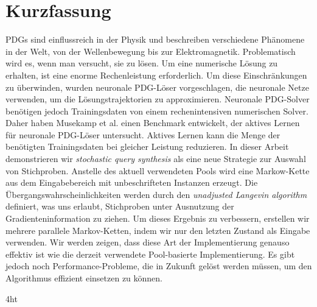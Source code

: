 \documentclass[
  a4paper,  %
  twoside,  %
  bibliography=totoc,
  headsepline,
  cleardoublepage=empty,
  parskip=half,
  draft=false
]{scrbook}
\begin{document}
\cleardoublepage

\section*{Kurzfassung}
PDGs sind einflussreich in der Physik und beschreiben 
verschiedene Phänomene in der Welt, von der Wellenbewegung bis zur Elektromagnetik. Problematisch wird es, wenn man versucht, sie zu lösen. 
Um eine numerische Lösung zu erhalten, 
ist eine enorme Rechenleistung erforderlich. Um diese Einschränkungen zu überwinden, wurden neuronale PDG-Löser vorgeschlagen, die neuronale Netze verwenden, 
um die Lösungstrajektorien zu approximieren. Neuronale PDG-Solver benötigen jedoch Trainingsdaten von einem rechenintensiven numerischen Solver. Daher haben Musekamp et al. einen Benchmark entwickelt,
der aktives Lernen für neuronale PDG-Löser untersucht.
Aktives Lernen kann die Menge der benötigten Trainingsdaten bei gleicher Leistung reduzieren. In dieser Arbeit demonstrieren wir \textit{stochastic query synthesis} als eine
neue Strategie zur Auswahl von Stichproben. Anstelle des aktuell verwendeten Pools wird eine Markow-Kette aus dem Eingabebereich mit unbeschrifteten Instanzen erzeugt. Die
Übergangswahrscheinlichkeiten werden durch den \textit{unadjusted Langevin algorithm} definiert, was uns erlaubt, Stichproben unter Ausnutzung der Gradienteninformation zu 
ziehen. Um dieses Ergebnis zu verbessern, erstellen wir mehrere parallele Markov-Ketten, indem wir nur den letzten Zustand als Eingabe verwenden. 
Wir werden zeigen, dass diese Art der Implementierung genauso effektiv ist wie die derzeit verwendete Pool-basierte Implementierung. Es gibt jedoch noch Performance-Probleme, die in Zukunft gelöst werden müssen, um den Algorithmus effizient einsetzen zu können.

\cleardoublepage



\iftex4ht
\else
\fi

%
%

%
%
%
\tableofcontents
\end{document}
